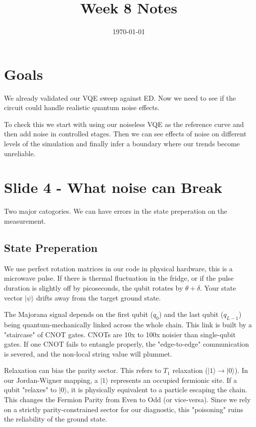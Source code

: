 \documentclass[11pt]{article}
\title{Week 8 Notes}
\author{}
\date{\today}
\begin{document}
\maketitle

\section{Goals}
We already validated our VQE sweep against ED. Now we need to see if the circuit could handle realistic quantum noise effects.

To check this we start with using our noiseless VQE as the reference curve and then add noise in controlled stages. Then we can see effects of noise on different levels of the simulation and finally infer a boundary where our trends become unreliable.

\section{Slide 4 - What noise can Break}

Two major catogories. We can have errors in the state preperation on the measurement.

\subsection{State Preperation}

We use perfect rotation matrices in our code in physical hardware, this is a microwave pulse. If there is thermal fluctuation in the fridge, or if the pulse duration is slightly off by picoseconds, the qubit rotates by $\theta + \delta$. Your state vector $|\psi\rangle$ drifts away from the target ground state.

The Majorana signal depends on the first qubit ($q_0$) and the last qubit ($q_{L-1}$) being quantum-mechanically linked across the whole chain. This link is built by a "staircase" of CNOT gates. CNOTs are 10x to 100x noisier than single-qubit gates. If one CNOT fails to entangle properly, the "edge-to-edge" communication is severed, and the non-local string value will plummet.

Relaxation can bias the parity sector. This refers to $T_1$ relaxation ($|1\rangle \rightarrow |0\rangle$). In our Jordan-Wigner mapping, a $|1\rangle$ represents an occupied fermionic site. If a qubit "relaxes" to $|0\rangle$, it is physically equivalent to a particle escaping the chain. This changes the Fermion Parity from Even to Odd (or vice-versa). Since we rely on a strictly parity-constrained sector for our diagnostic, this "poisoning" ruins the reliability of the ground state.
\end{document}
